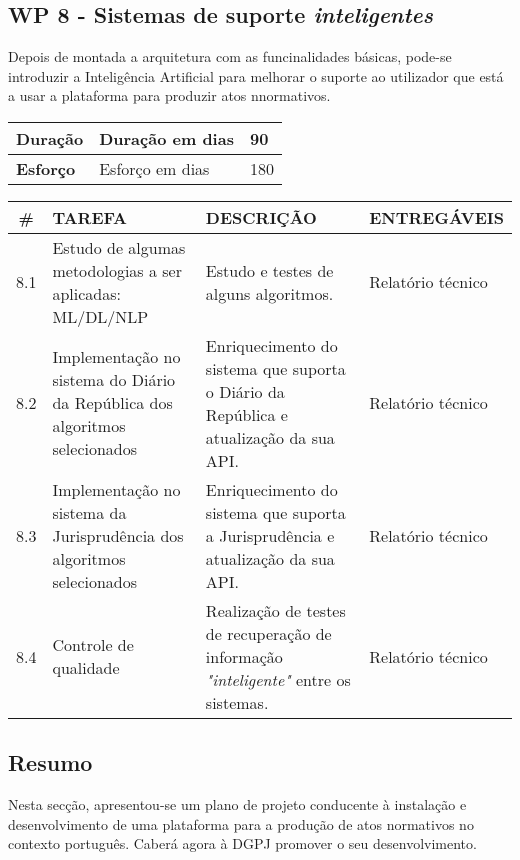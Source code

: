 \subsection{WP 8 - Sistemas de suporte \emph{inteligentes}}

Depois de montada a arquitetura com as funcinalidades básicas, pode-se introduzir a Inteligência Artificial para melhorar 
o suporte ao utilizador que está a usar a plataforma para produzir atos nnormativos.

\begin{tabular}{|p{3cm}|p{5cm}|l|}
    \hline
    \textbf{Duração} & Duração em dias & 90 \\
    \hline
    \textbf{Esforço} & Esforço em dias & 180\\
    \hline
\end{tabular}

\vspace{0.5cm}

\begin{longtable}{|c|p{5cm}|p{7cm}|p{3cm}|}
    \hline
    \# & \textbf{TAREFA} & \textbf{DESCRIÇÃO} & \textbf{ENTREGÁVEIS} \\
    \hline
    8.1 & Estudo de algumas metodologias a ser aplicadas: ML/DL/NLP & Estudo e testes de alguns algoritmos. & Relatório técnico \\
    \hline
    8.2 & Implementação no sistema do Diário da República dos algoritmos selecionados & 
    Enriquecimento do sistema que suporta o Diário da República e atualização da sua API. & Relatório técnico \\
    \hline
    8.3 & Implementação no sistema da Jurisprudência dos algoritmos selecionados & 
    Enriquecimento do sistema que suporta a Jurisprudência e atualização da sua API. & Relatório técnico \\
    \hline
    8.4 & Controle de qualidade & Realização de testes de recuperação de informação \emph{"inteligente"} entre os sistemas.
    & Relatório técnico \\
    \hline
\end{longtable}


\subsection{Resumo}

Nesta secção, apresentou-se um plano de projeto conducente à instalação e desenvolvimento de uma plataforma 
para a produção de atos normativos no contexto português.
Caberá agora à DGPJ promover o seu desenvolvimento.

